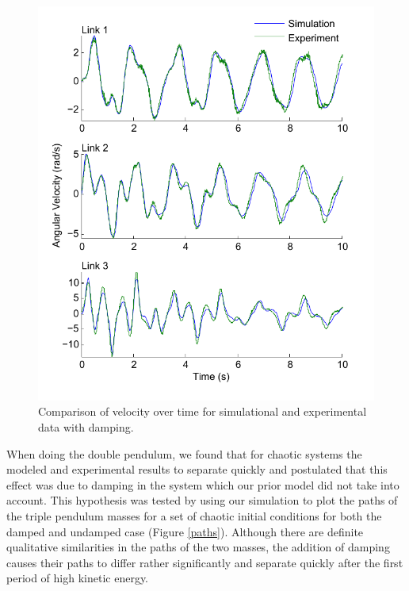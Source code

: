 \begin{figure}[H]
\centering
\includegraphics[scale=0.65]{comparison_velocity_damped.pdf}
\caption{Comparison of velocity over time for simulational and experimental data with damping.}
\label{velocityresults}
\end{figure}

When doing the double pendulum, we found that for chaotic systems the modeled and experimental results to separate quickly and postulated that this effect was due to damping in the system which our prior model did not take into account.  This hypothesis was tested by using our simulation to plot the paths of the triple pendulum masses for a set of chaotic initial conditions for both the damped and undamped case (Figure \ref{paths}).  Although there are definite qualitative similarities in the paths of the two masses, the addition of damping causes their paths to differ rather significantly and separate quickly after the first period of high kinetic energy.


